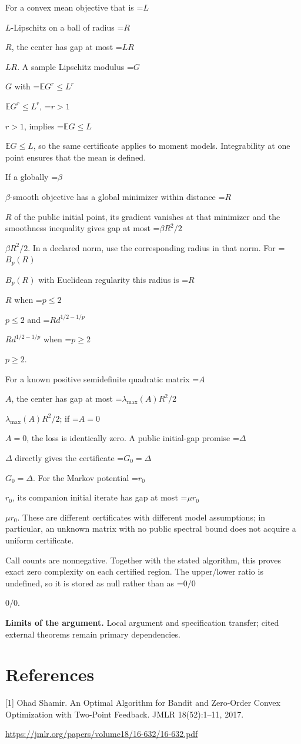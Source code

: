 \documentclass[10pt,a4paper]{article}
\newcommand{\AtlasMath}[1]{\par\begingroup\centering\setbox0=\hbox{$\displaystyle #1$}\ifdim\wd0>1.4\linewidth\typeout{ATLAS WIDE FORMULA: \the\wd0}\fi\ifdim\wd0>\linewidth\resizebox{\linewidth}{!}{\box0}\else\box0\fi\par\endgroup}
\newcommand{\AtlasInlineMath}[1]{\begingroup\setbox0=\hbox{$#1$}\ifdim\wd0>.4\linewidth\endgroup\AtlasMath{#1}\else\endgroup$#1$\fi}
\begin{document}
For a convex mean objective that is \AtlasInlineMath{L}-Lipschitz on a ball of radius \AtlasInlineMath{R}, the center has gap at most \AtlasInlineMath{LR}. A sample Lipschitz modulus \AtlasInlineMath{G} with \AtlasInlineMath{\mathbb E G^r\le L^r}, \AtlasInlineMath{r>1}, implies \AtlasInlineMath{\mathbb E G\le L}, so the same certificate applies to moment models. Integrability at one point ensures that the mean is defined.

If a globally \AtlasInlineMath{\beta}-smooth objective has a global minimizer within distance \AtlasInlineMath{R} of the public initial point, its gradient vanishes at that minimizer and the smoothness inequality gives gap at most \AtlasInlineMath{\beta R^2/2}. In a declared norm, use the corresponding radius in that norm. For \AtlasInlineMath{B_p(R)} with Euclidean regularity this radius is \AtlasInlineMath{R} when \AtlasInlineMath{p\le2} and \AtlasInlineMath{R d^{1/2-1/p}} when \AtlasInlineMath{p\ge2}.

For a known positive semidefinite quadratic matrix \AtlasInlineMath{A}, the center has gap at most \AtlasInlineMath{\lambda_{\max}(A)R^2/2}; if \AtlasInlineMath{A=0}, the loss is identically zero. A public initial-gap promise \AtlasInlineMath{\Delta} directly gives the certificate \AtlasInlineMath{G_0=\Delta}. For the Markov potential \AtlasInlineMath{r_0}, its companion initial iterate has gap at most \AtlasInlineMath{\mu r_0}. These are different certificates with different model assumptions; in particular, an unknown matrix with no public spectral bound does not acquire a uniform certificate.

Call counts are nonnegative. Together with the stated algorithm, this proves exact zero complexity on each certified region. The upper/lower ratio is undefined, so it is stored as null rather than as \AtlasInlineMath{0/0}.

\textbf{Limits of the argument.} Local argument and specification transfer; cited external theorems remain primary dependencies.

\section{References}
[1] Ohad Shamir. An Optimal Algorithm for Bandit and Zero-Order Convex Optimization with Two-Point Feedback. JMLR 18(52):1--11, 2017.

\url{https://jmlr.org/papers/volume18/16-632/16-632.pdf}
\end{document}
